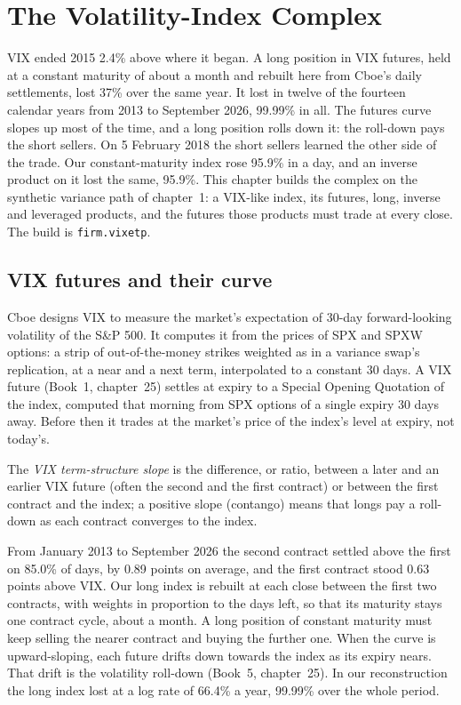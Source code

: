 \chapter{The Volatility-Index Complex}\label{ch:s2:the-volatility-index-complex}

VIX ended 2015 2.4\% above where it began. A long position in VIX futures, held at a constant maturity of about a month and rebuilt here from
Cboe's daily settlements, lost 37\% over the same year. It lost in twelve of the fourteen calendar years from 2013 to September 2026, 99.99\% in all. The futures
curve slopes up most of the time, and a long position rolls down it: the roll-down pays the short sellers. On 5 February 2018 the short sellers
learned the other side of the trade. Our constant-maturity index rose 95.9\% in a day, and an inverse product on it lost the same, 95.9\%. This chapter
builds the complex on the synthetic variance path of chapter~1: a VIX-like index, its futures, long, inverse and leveraged products, and the futures
those products must trade at every close. The build is \texttt{firm.vixetp}.

\section{VIX futures and their curve}

Cboe designs VIX to measure the market's expectation of 30-day forward-looking volatility of the S\&P 500. It computes it from the prices of SPX and
SPXW options: a strip of out-of-the-money strikes weighted as in a variance swap's replication, at a near and a next term, interpolated to a constant
30 days. A VIX future (Book~1, chapter~25) settles at expiry to a Special Opening Quotation of the index, computed that morning from
SPX options of a single expiry 30 days away. Before then it trades at the market's price of
the index's level at expiry, not today's.

\begin{definition}\label{def:s2:the-volatility-index-complex:slope}
The \emph{VIX term-structure slope} is the difference, or ratio, between a later and an earlier VIX future (often the
second and the first contract) or between the first contract and the index; a positive slope (contango) means that longs pay a roll-down as each
contract converges to the index.
\end{definition}

From January 2013 to September 2026 the second contract settled above the first on 85.0\% of days, by 0.89 points on average, and the first contract
stood 0.63 points above VIX. Our long index is rebuilt at each close
between the first two contracts, with weights in proportion to the days left, so that its maturity stays one contract cycle, about a month.
A long position of constant maturity must keep selling the nearer contract and buying the further one. When the curve is
upward-sloping, each future drifts down towards the index as its expiry nears. That drift is the volatility roll-down (Book~5, chapter~25). In our
reconstruction the long index lost at a log rate of 66.4\% a year, 99.99\% over the whole period.

